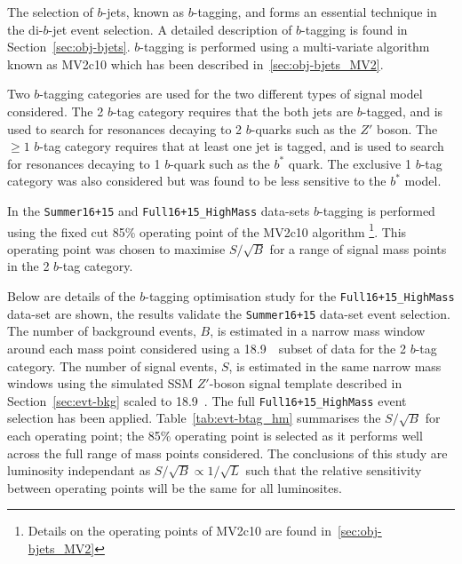 The selection of $b$-jets, known as $b$-tagging,
and forms an essential technique in the di-$b$-jet event selection.
A detailed description of $b$-tagging is found in Section~\ref{sec:obj-bjets}.
$b$-tagging is performed using a multi-variate algorithm known as MV2c10 which has been described in~\ref{sec:obj-bjets_MV2}.

Two $b$-tagging categories are used for the two different types of signal model considered.
The 2 $b$-tag category requires that the both jets are $b$-tagged,
and is used to search for resonances decaying to 2 $b$-quarks such as the $Z'$ boson.
The $\geq 1$ $b$-tag category requires that at least one jet is tagged,
and is used to search for resonances decaying to 1 $b$-quark such as the $b^*$ quark.
The exclusive 1 $b$-tag category was also considered but was found to be less sensitive to the $b^*$ model.

In the \verb|Summer16+15| and \verb|Full16+15_HighMass| data-sets
$b$-tagging is performed using the fixed cut 85\% operating point of the MV2c10 algorithm
\footnote{Details on the operating points of MV2c10 are found in~\ref{sec:obj-bjets_MV2}}.
This operating point was chosen to maximise $S/\sqrt{B}$ for a range of signal mass points in the 2 $b$-tag category.

Below are details of the $b$-tagging optimisation study for the \verb|Full16+15_HighMass| data-set are shown,
the results validate the \verb|Summer16+15| data-set event selection.
The number of background events, $B$, is estimated in
a narrow mass window around
each mass point considered using a
18.9~\ifb~subset of data for the 2 $b$-tag category.
The number of signal events, $S$, is estimated
in the same narrow mass windows using 
the simulated SSM $Z'$-boson signal template
described in Section~\ref{sec:evt-bkg} scaled to 18.9~\ifb.
The full \verb|Full16+15_HighMass| event selection has been applied.
Table~\ref{tab:evt-btag_hm} summarises the $S/\sqrt{B}$ for each operating point;
the 85\% operating point is selected as it performs well across the full range of mass points considered.
The conclusions of this study are luminosity independant
as $S/\sqrt{B} \propto 1/\sqrt{L}$ such that the relative sensitivity
between operating points will be the same for all luminosites.

